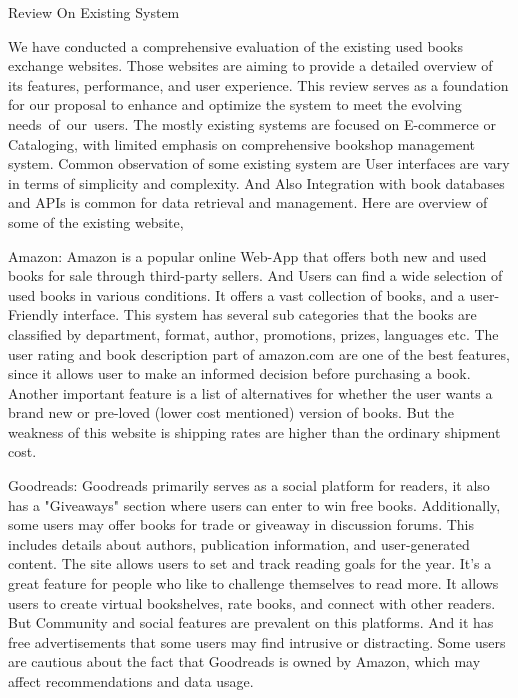 Review On Existing System


We have conducted a comprehensive evaluation of the existing used books exchange websites. 
Those websites are aiming to provide a detailed overview of its features, performance, and user experience. 
This review serves as a foundation for our proposal to enhance and optimize the system to meet the evolving needs of our users. 
The mostly existing systems are focused on E-commerce or Cataloging, with limited emphasis on comprehensive bookshop management system.
Common observation of some existing system are User interfaces are vary in terms of simplicity and complexity.
 And Also Integration with book databases and APIs is common for data retrieval and management.
Here are overview of some of the existing website,

    Amazon:
      Amazon is a popular online Web-App that offers both new and used books for sale through third-party sellers. 
      And Users can find a wide selection of used books in various conditions. It offers a vast collection of books, and a user-Friendly interface.
      This system has several sub categories that the books are classified by department, format, author, promotions, prizes, languages etc.
      The user rating and book description part of amazon.com are one of the best features, since it allows user to make an informed decision before purchasing a book.
      Another important feature is a list of alternatives for whether the user wants a brand new or pre-loved (lower cost mentioned) version of books. 
      But the weakness of this website is shipping rates are higher than the ordinary shipment cost. 


     Goodreads: 
	Goodreads primarily serves as a social platform for readers, it also has a "Giveaways" section where users can enter to win free books.
 	Additionally, some users may offer books for trade or giveaway in discussion forums. 
	This includes details about authors, publication information, and user-generated content. 
	The site allows users to set and track reading goals for the year. 
	It's a great feature for people who like to challenge themselves to read more.
	It allows users to create virtual bookshelves, rate books, and connect with other readers. 
	But Community and social features are prevalent on this platforms. 
	And it has free advertisements that some users may find intrusive or distracting. 
	Some users are cautious about the fact that Goodreads is owned by Amazon, which may affect recommendations and data usage.

